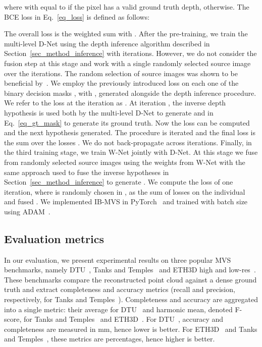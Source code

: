 \documentclass{bmvc2k}
\begin{document}
where  with  equal to  if the pixel has a valid ground truth depth,  otherwise.
The BCE loss in Eq.~\eqref{eq_loss} is defined as follows:

The overall loss is the weighted sum  with .
After the pre-training, we train the multi-level D-Net using the depth inference algorithm described in Section~\ref{sec_method_inference} with  iterations.
However, we do not consider the fusion step at this stage and work with a single randomly selected source image over the  iterations. 
The random selection of source images was shown to be beneficial by~\cite{patchmatchnet}.
We employ the previously introduced loss  on each one of the binary decision masks , with , generated alongside the depth inference procedure.
We refer to the loss at the iteration  as .
At iteration , the inverse depth hypothesis  is used both by the multi-level D-Net to generate  and in Eq.~\eqref{eq_gt_mask} to generate its ground truth.
Now the loss  can be computed and the next hypothesis  generated.
The procedure is iterated and the final loss is the sum over the  losses .
We do not back-propagate across iterations. 
Finally, in the third training stage, we train W-Net jointly with D-Net.
At this stage we fuse  from  randomly selected source images using the weights from W-Net with the same approach used to fuse the inverse hypotheses in Section~\ref{sec_method_inference} to generate .
We compute the loss  of one iteration, where  is randomly chosen in , as the sum of losses on the  individual  and fused . 
We implemented IB-MVS in PyTorch~\cite{pytorch} and trained with batch size  using ADAM~\cite{adam_optimizer}. 
\subsection{Evaluation metrics}
In our evaluation, we present experimental results on three popular MVS benchmarks, namely DTU~\cite{dtu}, Tanks and Temples~\cite{tanksandtemples} and ETH3D high and low-res~\cite{eth3d}. These benchmarks compare the reconstructed point cloud against a dense ground truth and extract completeness and accuracy metrics (recall and precision, respectively, for Tanks and Temples~\cite{tanksandtemples}). Completeness and accuracy are aggregated into a single metric: their average for DTU~\cite{dtu} and harmonic mean, denoted F-score, for Tanks and Temples~\cite{tanksandtemples} and ETH3D~\cite{eth3d}. For DTU~\cite{dtu}, accuracy and completeness are measured in mm, hence lower is better. For ETH3D~\cite{eth3d} and Tanks and Temples~\cite{tanksandtemples}, these metrics are percentages, hence higher is better.
\end{document}
